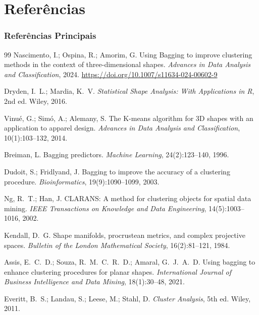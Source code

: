 \documentclass[brazilian,11pt]{beamer}
\begin{document}
\section[Refs]{Referências}

\begin{frame}[allowframebreaks]
    \frametitle{Referências Principais}
    \footnotesize
    \begin{thebibliography}{99}
        Nascimento, I.; Ospina, R.; Amorim, G.
        Using Bagging to improve clustering methods in the context of three-dimensional shapes.
        \textit{Advances in Data Analysis and Classification}, 2024.
        \url{https://doi.org/10.1007/s11634-024-00602-9}

        Dryden, I.\ L.; Mardia, K.\ V.
        \textit{Statistical Shape Analysis: With Applications in R}, 2nd ed.
        Wiley, 2016.

        Vinué, G.; Simó, A.; Alemany, S.
        The K-means algorithm for 3D shapes with an application to apparel design.
        \textit{Advances in Data Analysis and Classification}, 10(1):103--132, 2014.

        Breiman, L.
        Bagging predictors.
        \textit{Machine Learning}, 24(2):123--140, 1996.

        Dudoit, S.; Fridlyand, J.
        Bagging to improve the accuracy of a clustering procedure.
        \textit{Bioinformatics}, 19(9):1090--1099, 2003.

        Ng, R.\ T.; Han, J.
        CLARANS: A method for clustering objects for spatial data mining.
        \textit{IEEE Transactions on Knowledge and Data Engineering}, 14(5):1003--1016, 2002.

        Kendall, D.\ G.
        Shape manifolds, procrustean metrics, and complex projective spaces.
        \textit{Bulletin of the London Mathematical Society}, 16(2):81--121, 1984.

        Assis, E.\ C.\ D.; Souza, R.\ M.\ C.\ R.\ D.; Amaral, G.\ J.\ A.\ D.
        Using bagging to enhance clustering procedures for planar shapes.
        \textit{International Journal of Business Intelligence and Data Mining}, 18(1):30--48, 2021.

        Everitt, B.\ S.; Landau, S.; Leese, M.; Stahl, D.
        \textit{Cluster Analysis}, 5th ed.
        Wiley, 2011.


\end{thebibliography}
\end{frame}
\end{document}
